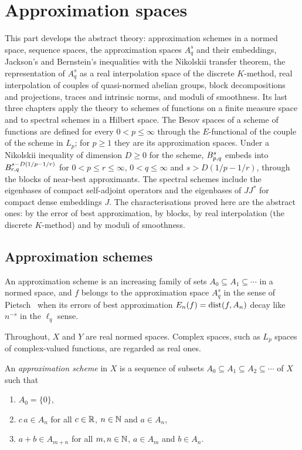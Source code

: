 
\part{Approximation spaces}
\label{part:approximation}

This part develops the abstract theory: approximation schemes in a normed space, sequence
spaces, the approximation spaces $A^s_q$ and their embeddings, Jackson's and Bernstein's
inequalities with the Nikolskii transfer theorem, the representation of $A^s_q$ as a real
interpolation space of the discrete $K$-method, real interpolation of couples of quasi-normed
abelian groups, block decompositions and projections, traces and intrinsic norms, and moduli of
smoothness. Its last three chapters apply the theory to schemes of functions on a
finite measure space and to spectral schemes in a Hilbert space. The Besov spaces of a scheme of
functions are defined for every $0 < p \leq \infty$ through the $E$-functional of the couple of
the scheme in $L_p$; for $p \geq 1$ they are its approximation spaces. Under a Nikolskii
inequality of dimension $D \geq 0$ for the scheme, $B^{s}_{p,q}$ embeds into
$B^{s - D(1/p - 1/r)}_{r,q}$ for $0 < p \leq r \leq \infty$, $0 < q \leq \infty$ and
$s > D(1/p - 1/r)$, through the blocks of near-best approximants. The spectral schemes include
the eigenbases of compact self-adjoint operators and the eigenbases of $J J^*$ for compact dense
embeddings $J$.
The characterisations proved here are the abstract ones: by the error of best approximation, by
blocks, by real interpolation (the discrete $K$-method) and by moduli of smoothness.

\chapter{Approximation schemes}
\label{ch:schemes}

An approximation scheme is an increasing family of sets $A_0 \subseteq A_1 \subseteq \cdots$ in a
normed space, and $f$ belongs to the approximation space $A^s_q$ in the sense of
Pietsch~\cite{Pietsch} when its errors of best approximation $E_n(f) = \operatorname{dist}(f, A_n)$ decay like
$n^{-s}$ in the $\ell_q$ sense.

Throughout, $X$ and $Y$ are real normed spaces. Complex spaces, such as $L_p$ spaces of
complex-valued functions, are regarded as real ones.

\begin{definition}
\label{def:scheme}
\leanok
An \emph{approximation scheme} in $X$ is a sequence of subsets
$A_0 \subseteq A_1 \subseteq A_2 \subseteq \cdots$ of $X$ such that
\begin{enumerate}
  \item $A_0 = \{0\}$,
  \item $c\,a \in A_n$ for all $c \in \mathbb{R}$, $n \in \mathbb{N}$ and $a \in A_n$,
  \item $a + b \in A_{m+n}$ for all $m, n \in \mathbb{N}$, $a \in A_m$ and $b \in A_n$.
\end{enumerate}
\end{definition}

